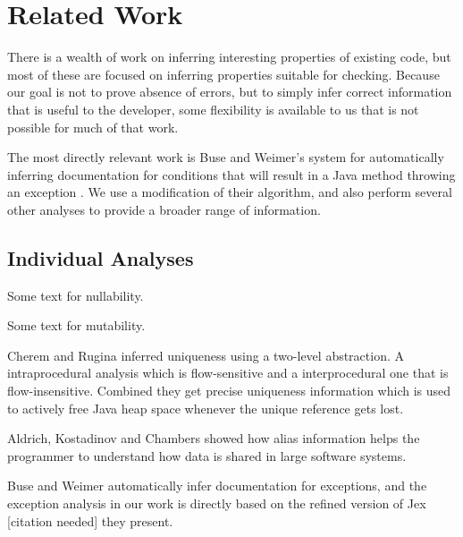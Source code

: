 \section{Related Work}
There is a wealth of work on inferring interesting properties of existing code,
but most of these are focused on inferring properties suitable for checking.
Because our goal is not to prove absence of errors, but to simply infer correct
information that is useful to the developer, some flexibility is available to us
that is not possible for much of that work.

The most directly relevant work is Buse and Weimer's system for automatically
inferring documentation for conditions that will result in a Java method
throwing an exception \cite{autodoc}.  We use a modification of their
algorithm, and also perform several other analyses to provide a broader range
of information.

\subsection{Individual Analyses}
Some text for nullability.

Some text for mutability.

Cherem and Rugina \cite{UniquenessInference} inferred uniqueness using a two-level
abstraction. A intraprocedural analysis which is flow-sensitive and a interprocedural
one that is flow-insensitive. Combined they get precise uniqueness information
which is used to actively free Java heap space whenever the unique reference gets lost.

Aldrich, Kostadinov and Chambers \cite{AliasJava} showed how alias information 
helps the programmer to understand how data is shared in large software systems.

Buse and Weimer \cite{autodoc} automatically infer documentation for
exceptions, and the exception analysis in our work is directly based on the
refined version of {\sc Jex} [citation needed] they present.
